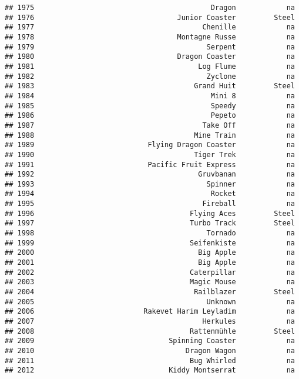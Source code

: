 \documentclass[
]{article}
\begin{document}
\begin{verbatim}
## 1975                                          Dragon            na
## 1976                                  Junior Coaster         Steel
## 1977                                        Chenille            na
## 1978                                  Montagne Russe            na
## 1979                                         Serpent            na
## 1980                                  Dragon Coaster            na
## 1981                                       Log Flume            na
## 1982                                         Zyclone            na
## 1983                                      Grand Huit         Steel
## 1984                                          Mini 8            na
## 1985                                          Speedy            na
## 1986                                          Pepeto            na
## 1987                                        Take Off            na
## 1988                                      Mine Train            na
## 1989                           Flying Dragon Coaster            na
## 1990                                      Tiger Trek            na
## 1991                           Pacific Fruit Express            na
## 1992                                       Gruvbanan            na
## 1993                                         Spinner            na
## 1994                                          Rocket            na
## 1995                                        Fireball            na
## 1996                                     Flying Aces         Steel
## 1997                                     Turbo Track         Steel
## 1998                                         Tornado            na
## 1999                                     Seifenkiste            na
## 2000                                       Big Apple            na
## 2001                                       Big Apple            na
## 2002                                     Caterpillar            na
## 2003                                     Magic Mouse            na
## 2004                                      Railblazer         Steel
## 2005                                         Unknown            na
## 2006                          Rakevet Harim Leyladim            na
## 2007                                        Herkules            na
## 2008                                     Rattenmühle         Steel
## 2009                                Spinning Coaster            na
## 2010                                    Dragon Wagon            na
## 2011                                     Bug Whirled            na
## 2012                                Kiddy Montserrat            na

\end{verbatim}
\end{document}
